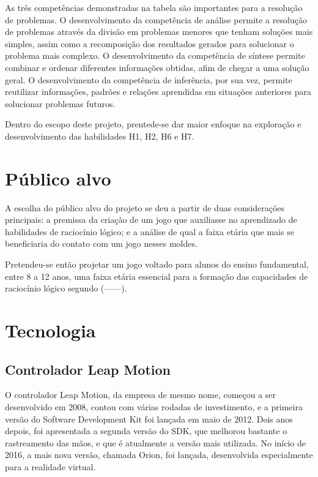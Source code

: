 As três competências demonstradas na tabela são importantes para a resolução de problemas. O desenvolvimento da competência de análise permite a resolução de problemas através da divisão em problemas menores que tenham soluções mais simples, assim como a recomposição dos resultados gerados para solucionar o problema mais complexo. O desenvolvimento da competência de síntese permite combinar e ordenar diferentes informações obtidas, afim de chegar a uma solução geral. O desenvolvimento da competência de inferência, por sua vez, permite reutilizar informações, padrões e relações aprendidas em situações anteriores para solucionar problemas futuros.

Dentro do escopo deste projeto, prentede-se dar maior enfoque na exploração e desenvolvimento das habilidades H1, H2, H6 e H7.

\section{Público alvo}\label{sec-publico-alvo}

A escolha do público alvo do projeto se deu a partir de duas considerações principais: a premissa da criação de um jogo que auxiliasse no aprendizado de habilidades de raciocínio lógico; e a análise de qual a faixa etária que mais se beneficiaria do contato com um jogo nesses moldes.

Pretendeu-se então projetar um jogo voltado para alunos do ensino fundamental, entre 8 a 12 anos, uma faixa etária essencial para a formação das capacidades de raciocínio lógico segundo (------).


\section{Tecnologia}\label{sec-tecnologia}


\subsection{Controlador Leap Motion}\label{subsubsec-teo-leap-motion}

O controlador Leap Motion, da empresa de mesmo nome, começou a ser desenvolvido em 2008, contou com várias rodadas de investimento, e a primeira versão do Software Development Kit foi lançada em maio de 2012. Dois anos depois, foi apresentada a segunda versão do SDK, que melhorou bastante o rastreamento das mãos, e que é atualmente a versão mais utilizada. No início de 2016, a mais nova versão, chamada Orion, foi lançada, desenvolvida especialmente para a realidade virtual.

